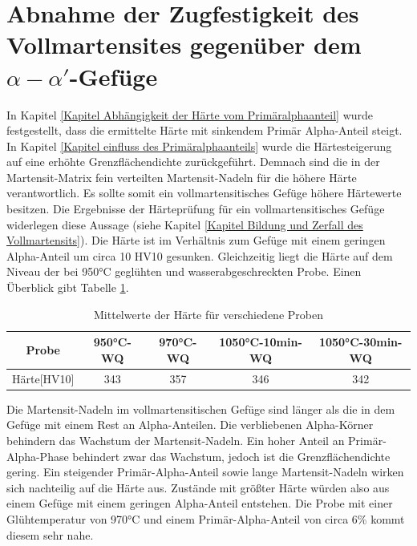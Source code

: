 \documentclass[a4paper, 11pt]{tubsreprt}
\begin{document}
\section{Abnahme der Zugfestigkeit des Vollmartensites gegenüber dem $\alpha-\alpha'$-Gefüge}
In Kapitel \ref{Kapitel Abhängigkeit der Härte vom Primäralphaanteil} wurde festgestellt, dass die ermittelte Härte mit sinkendem Primär Alpha-Anteil steigt. In Kapitel \ref{Kapitel einfluss des Primäralphaanteils} wurde die Härtesteigerung auf eine erhöhte Grenzflächendichte zurückgeführt. Demnach sind die in der Martensit-Matrix fein verteilten Martensit-Nadeln für die höhere Härte verantwortlich.
Es sollte somit ein vollmartensitisches Gefüge höhere Härtewerte besitzen.
Die Ergebnisse der Härteprüfung für ein vollmartensitisches Gefüge  widerlegen diese Aussage (siehe Kapitel \ref{Kapitel Bildung und Zerfall des Vollmartensits}). Die Härte ist im Verhältnis zum Gefüge mit einem geringen Alpha-Anteil um circa 10 HV10 gesunken. Gleichzeitig liegt die Härte auf dem Niveau der bei 950°C geglühten und wasserabgeschreckten Probe. Einen Überblick gibt Tabelle \ref{Tabelle Mittelwerte Härte für verschiedene Proben}.
\begin{table}
\begin{tabular}{c|c|c|c|c}
Probe & 950°C-WQ & 970°C-WQ & 1050°C-10min-WQ & 1050°C-30min-WQ \\
\hline
Härte[HV10] & 343 & 357 & 346 & 342 \\
\end{tabular}
\caption{Mittelwerte der Härte für verschiedene Proben}
\label{Tabelle Mittelwerte Härte für verschiedene Proben}
\end{table}

Die Martensit-Nadeln im vollmartensitischen Gefüge sind länger als die in dem Gefüge mit einem Rest an Alpha-Anteilen. Die verbliebenen Alpha-Körner behindern das Wachstum der Martensit-Nadeln. Ein hoher Anteil an Primär-Alpha-Phase behindert zwar das Wachstum, jedoch ist die Grenzflächendichte gering. Ein steigender Primär-Alpha-Anteil sowie lange Martensit-Nadeln wirken sich nachteilig auf die Härte aus. Zustände mit größter Härte würden also aus einem Gefüge mit einem geringen Alpha-Anteil entstehen. Die Probe mit einer Glühtemperatur von 970°C und einem Primär-Alpha-Anteil von circa 6\% kommt diesem sehr nahe.
\end{document}
